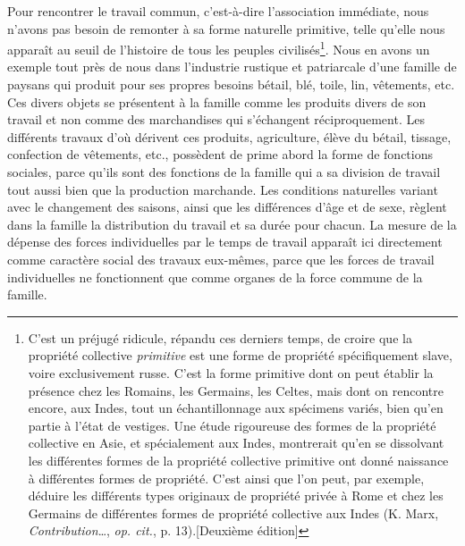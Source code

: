 \documentclass[french,twoside]{book} %
\begin{document}
Pour rencontrer le travail commun, c’est-à-dire l’association immédiate, nous n’avons pas besoin de remonter à sa forme naturelle primitive, telle qu’elle nous apparaît au seuil de l’histoire de tous les peuples civilisés\footnote{C’est un préjugé ridicule, répandu ces derniers temps, de croire que la propriété collective \emph{primitive} est une forme de propriété spécifiquement slave, voire exclusivement russe. C’est la forme primitive dont on peut établir la présence chez les Romains, les Germains, les Celtes, mais dont on rencontre encore, aux Indes, tout un échantillonnage aux spécimens variés, bien qu’en partie à l’état de vestiges. Une étude rigoureuse des formes de la propriété collective en Asie, et spécialement aux Indes, montrerait qu’en se dissolvant les différentes formes de la propriété collective primitive ont donné naissance à différentes formes de propriété. C’est ainsi que l’on peut, par exemple, déduire les différents types originaux de propriété privée à Rome et chez les Germains de différentes formes de propriété collective aux Indes (K. Marx, \emph{Contribution}…, \emph{op. cit.}, p. 13).[Deuxième édition]}. Nous en avons un exemple tout près de nous dans l’industrie rustique et patriarcale d’une famille de paysans qui produit pour ses propres besoins bétail, blé, toile, lin, vêtements, etc. Ces divers objets se présentent à la famille comme les produits divers de son travail et non comme des marchandises qui s’échangent réciproquement. Les différents travaux d’où dérivent ces produits, agriculture, élève du bétail, tissage, confection de vêtements, etc., possèdent de prime abord la forme de fonctions sociales, parce qu’ils sont des fonctions de la famille qui a sa division de travail tout aussi bien que la production marchande. Les conditions naturelles variant avec le changement des saisons, ainsi que les différences d’âge et de sexe, règlent dans la famille la distribution du travail et sa durée pour chacun. La mesure de la dépense des forces individuelles par le temps de travail apparaît ici directement comme caractère social des travaux eux-mêmes, parce que les forces de travail individuelles ne fonctionnent que comme organes de la force commune de la famille.\par
\end{document}
